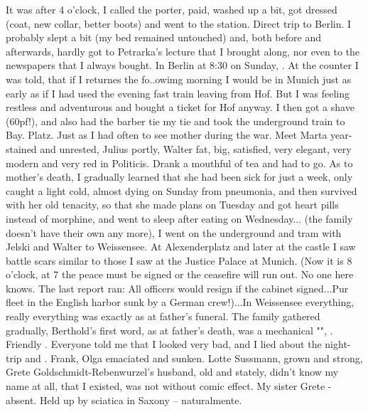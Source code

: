 It was after 4 o'clock, I called the porter, paid, washed up a bit, got dressed (coat, new collar, better boots) and went to the station. Direct trip to Berlin. I probably slept a bit (my bed remained untouched) and, both before and afterwards, hardly got to Petrarka's lecture that I brought along, nor even to the newspapers that I always bought. In Berlin at 8:30 on Sunday, . At the counter I was told, that if I returnes the fo..owimg morning I would be in Munich just as early as if I had used the evening fast train leaving from Hof. But I was feeling restless and adventurous and bought a ticket for Hof anyway. I then got a shave (60pf!), and also had the barber tie my tie and took the underground train to Bay. Platz. Just as I had often to see mother during the war. Meet Marta year-stained and unrested, Julius portly, Walter fat, big, satisfied, very elegant, very modern  and very red in Politicis. Drank a mouthful of tea and had to go. As to mother's death, I gradually learned that she had been sick for just a week, only caught a light cold, almost dying on Sunday from pneumonia, and then survived with her old tenacity, so that she made plans on Tuesday and got heart pills instead of morphine, and went to sleep after eating on Wednesday... (the family doesn't have their own any more), I went on the underground and tram with Jelski and Walter to Weissensee. At Alexenderplatz and later at the castle I saw battle scars similar to those I saw at the Justice Palace at Munich. (Now it is 8 o'clock, at 7 the peace must be signed or the ceasefire will run out. No one here knows. The last report ran: All officers would resign if the cabinet signed...Pur fleet in the English harbor sunk by a German crew!)...In Weissensee everything, really everything was exactly as at father's funeral. The family gathered gradually, Berthold's first word, as at father's death, was a mechanical "", . Friendly . Everyone told me that I looked very bad, and I lied about the night-trip and . Frank, Olga emaciated and sunken. Lotte Sussmann, grown and strong, Grete Goldschmidt-Rebenwurzel's husband, old and stately, didn't know my name at all, that I existed, was not without comic effect. My sister Grete - absent. Held up by sciatica in Saxony -- naturalmente.


